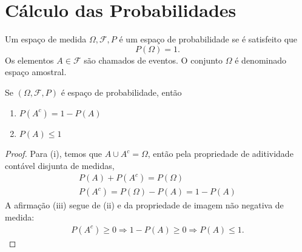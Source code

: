 \section{Cálculo das Probabilidades}

\begin{def:espaco de probabilidade}
Um espaço de medida \(\Omega, \mathcal{F}, P\) é um espaço de probabilidade se é satisfeito
que
\[
	P(\Omega) = 1.
\]
Os elementos $A \in \mathcal{F}$ são chamados de eventos.
O conjunto $\Omega$ é denominado espaço amostral.
\end{def:espaco de probabilidade}




\begin{thm:base calc prob}
Se $(\Omega, \mathcal{F}, P)$ é espaço de probabilidade, então
\begin{enumerate}
	\item[i.] $P(A^c) = 1 - P(A)$
	\item[ii.] $P(A) \leq 1$
\end{enumerate}
\begin{proof}
	Para (i), temos que $A \cup A^c = \Omega$, então pela propriedade de aditividade
	contável disjunta de medidas,
	\begin{gather*}
		P(A) + P(A^c) = P(\Omega) \\
		P(A^c) = P(\Omega) - P(A) = 1 - P(A)
	\end{gather*}
	A afirmação (iii) segue de (ii) e da propriedade de imagem não negativa
	de medida:
	\begin{gather*}
		P(A^c) \geq 0 \Longrightarrow 1 - P(A) \geq 0 \Longrightarrow P(A) \leq 1.
	\end{gather*}
\end{proof}
\end{thm:base calc prob}

